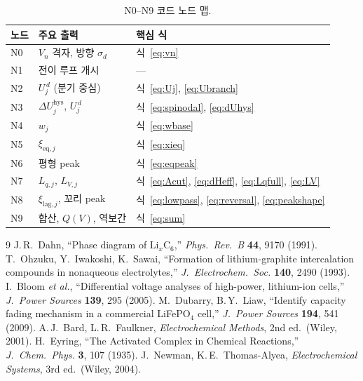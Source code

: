 \documentclass[11pt,a4paper]{article}
\newcommand{\eq}{\mathrm{eq}}
\newcommand{\hys}{\mathrm{hys}}
\newcommand{\lag}{\mathrm{lag}}
\begin{document}
\begin{table}[ht]
\centering
\caption{N0–N9 코드 노드 맵.\label{tab:nodemap}}
\small
\begin{tabular}{@{}lll@{}}
\toprule
노드 & 주요 출력 & 핵심 식\\
\midrule
N0 & $V_n$ 격자, 방향 $\sigma_d$ & 식~\eqref{eq:vn}\\
N1 & 전이 루프 개시 & ---\\
N2 & $U_j^{\,d}$ (분기 중심) & 식~\eqref{eq:Uj}, \eqref{eq:Ubranch}\\
N3 & $\Delta U_j^\hys$, $U_j^{\,d}$ & 식~\eqref{eq:spinodal}, \eqref{eq:dUhys}\\
N4 & $w_j$ & 식~\eqref{eq:wbase}\\
N5 & $\xi_{\eq,j}$ & 식~\eqref{eq:xieq}\\
N6 & 평형 peak & 식~\eqref{eq:eqpeak}\\
N7 & $L_{q,j}$, $L_{V,j}$ & 식~\eqref{eq:Acut}, \eqref{eq:dHeff}, \eqref{eq:Lqfull}, \eqref{eq:LV}\\
N8 & $\xi_{\lag,j}$, 꼬리 peak & 식~\eqref{eq:lowpass}, \eqref{eq:reversal}, \eqref{eq:peakshape}\\
N9 & 합산, $Q(V)$, 역보간 & 식~\eqref{eq:sum}\\
\bottomrule
\end{tabular}
\end{table}

\begin{thebibliography}{9}
 J.\,R.\ Dahn, ``Phase diagram of $\mathrm{Li}_x\mathrm{C}_6$,'' \textit{Phys.\ Rev.\ B} \textbf{44}, 9170 (1991).
 T.\ Ohzuku, Y.\ Iwakoshi, K.\ Sawai, ``Formation of lithium-graphite intercalation compounds in nonaqueous electrolytes,'' \textit{J.\ Electrochem.\ Soc.} \textbf{140}, 2490 (1993).
 I.\ Bloom \textit{et al.}, ``Differential voltage analyses of high-power, lithium-ion cells,'' \textit{J.\ Power Sources} \textbf{139}, 295 (2005).
 M.\ Dubarry, B.\,Y.\ Liaw, ``Identify capacity fading mechanism in a commercial LiFePO$_4$ cell,'' \textit{J.\ Power Sources} \textbf{194}, 541 (2009).
 A.\,J.\ Bard, L.\,R.\ Faulkner, \textit{Electrochemical Methods}, 2nd ed.\ (Wiley, 2001).
 H.\ Eyring, ``The Activated Complex in Chemical Reactions,'' \textit{J.\ Chem.\ Phys.} \textbf{3}, 107 (1935).
 J.\ Newman, K.\,E.\ Thomas-Alyea, \textit{Electrochemical Systems}, 3rd ed.\ (Wiley, 2004).
\end{thebibliography}
\end{document}
